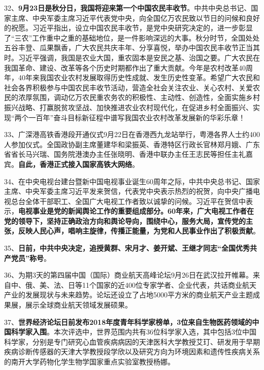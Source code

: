 32、{\textbf{9月23日是秋分日，我国将迎来第一个中国农民丰收节}}。中共中央总书记、国家主席、中央军委主席习近平代表党中央，向全国亿万农民致以节日的问候和良好的祝愿。习近平指出，设立中国农民丰收节，是党中央研究决定的，进一步彰显了``三农''工作重中之重的基础地位，是一件影响深远的大事。秋分时节，全国处处五谷丰登、瓜果飘香，广大农民共庆丰年、分享喜悦，举办中国农民丰收节正当其时。习近平强调，我国是农业大国，重农固本是安民之基、治国之要。广大农民在我国革命、建设、改革等各个历史时期都作出了重大贡献。今年是农村改革40周年，40年来我国农业农村发展取得历史性成就、发生历史性变革。希望广大农民和社会各界积极参与中国农民丰收节活动，营造全社会关注农业、关心农村、关爱农民的浓厚氛围，调动亿万农民重农务农的积极性、主动性、创造性，全面实施乡村振兴战略、打赢脱贫攻坚战、加快推进农业农村现代化，在促进乡村全面振兴、实现``两个一百年''奋斗目标新征程中谱写我国农业农村改革发展新的华彩乐章！

33、广深港高铁香港段开通仪式9月22日在香港西九龙站举行，粤港各界人士约400人参加仪式。全国政协副主席董建华和梁振英、香港特区行政长官林郑月娥、广东省省长马兴瑞、国务院港澳办主任张晓明、香港中联办主任王志民等担任主礼嘉宾。{\textbf{自此，香港正式接入国家高铁大网络}}。

34、在中央电视台建台暨新中国电视事业诞生60周年之际，中共中央总书记、国家主席、中央军委主席习近平发来贺信，代表党中央表示热烈的祝贺，向中央广播电视总台全体干部职工、全国广大电视工作者致以诚挚的问候。习近平在贺信中表示，{\textbf{电视事业是党的新闻舆论工作的重要组成部分。60年来，广大电视工作者在党的领导下，坚持正确政治方向和舆论导向，围绕中心，服务大局，宣传党的主张，反映人民心声，唱响主旋律，传播正能量，为党和人民事业作出了积极贡献}}。

35、{\textbf{日前，中共中央决定，追授黄群、宋月才、姜开斌、王继才同志``全国优秀共产党员''称号}}。

36、为期3天的第四届中国（国际）商业航天高峰论坛9月26日在武汉拉开帷幕。来自中、俄、美、法、日等11个国家的近400位专家学者、企业代表，共话商业航天产业的发展现状与未来趋势。论坛还设立了占地5000平方米的商业航天产业主题成果展，展示全球商业航天领域发展硕果。

37、{\textbf{世界经济论坛日前发布2018年度青年科学家榜单，3位来自生物医药领域的中国科学家入围}}。本次评选中，世界范围内共有36位科学家入选，其中包括3位中国科学家，分别是专门研究心血管疾病病因的天津医科大学教授艾玎、研发用于早期疾病诊断传感器的天津大学教授段学欣以及研究方向为环境因素和遗传性疾病关系的南开大学药物化学生物学国家重点实验室教授杨娜。

